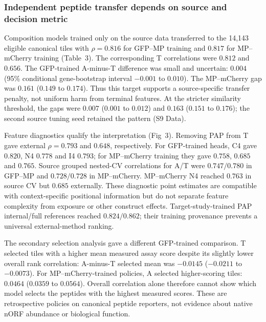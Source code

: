 \documentclass[11pt,a4paper]{article}
\begin{document}
\subsubsection{Independent peptide transfer depends on source and decision metric}
Composition models trained only on the source data transferred to the 14,143 eligible canonical
tiles with $\rho=0.816$ for GFP--MP training and $0.817$ for MP--mCherry
training (Table~3). The corresponding T correlations were
$0.812$ and $0.656$. The GFP-trained A-minus-T difference was small and
uncertain: $0.004$ (95\% conditional gene-bootstrap interval $-0.001$ to
$0.010$). The MP--mCherry gap was $0.161$ ($0.149$ to $0.174$).
Thus this target supports a source-specific transfer penalty, not uniform
harm from terminal features. At the stricter similarity threshold, the gaps
were $0.007$ ($0.001$ to $0.012$) and $0.163$ ($0.151$ to $0.176$);
the second source tuning seed retained the pattern (S9 Data).



Feature diagnostics qualify the interpretation (Fig~3).
Removing PAP from T gave external $\rho=0.793$ and $0.648$, respectively.
For GFP-trained heads, C4 gave $0.820$, N4 $0.778$ and I4 $0.793$;
for MP--mCherry training they gave $0.758$, $0.685$ and $0.765$.
Source grouped nested-CV correlations for A/T were $0.747/0.780$ in
GFP--MP and $0.728/0.728$ in MP--mCherry. MP--mCherry N4 reached
$0.763$ in source CV but $0.685$ externally. These diagnostic point
estimates are compatible with context-specific positional information but
do not separate feature complexity from exposure or other construct effects.
Target-study-trained PAP internal/full references reached $0.824/0.862$;
their training provenance prevents a universal external-method ranking.

The secondary selection analysis gave a different GFP-trained comparison.
T selected tiles with a higher mean measured assay score despite its slightly
lower overall rank correlation: A-minus-T selected mean was $-0.0145$
($-0.0211$ to $-0.0073$). For MP--mCherry-trained policies, A selected
higher-scoring tiles: $0.0464$ ($0.0359$ to $0.0564$). Overall correlation alone therefore cannot show which model selects the peptides with the highest measured scores. These are
retrospective policies on canonical peptide reporters, not evidence about
native nORF abundance or biological function.
\end{document}
